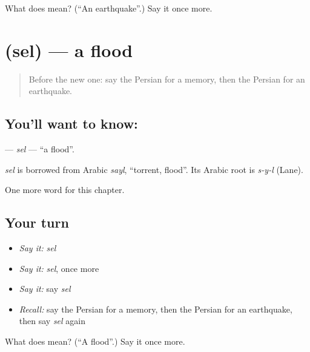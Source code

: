 \begin{tcolorbox}[breakable,colback=teal!4,colframe=teal!35!black,title={Before you move on}]
What does  mean? (\textquotedblleft{}An earthquake\textquotedblright{}.) Say it once more.
\end{tcolorbox}
\section[\texorpdfstring{\fa{سیل} (sel)}{سیل (sel)}]{ (sel) — a flood}

\label{lesson:FA-C244-sel}



\begin{quote}
Before the new one: say the Persian for a memory, then the Persian for an earthquake.
\end{quote}

\subsection*{You'll want to know: }
\textbf{} — \emph{sel} — \textquotedblleft{}a flood\textquotedblright{}.

\begin{cousinweb}
\emph{sel} is borrowed from Arabic \emph{sayl}, \textquotedblleft{}torrent, flood\textquotedblright{}. Its Arabic root is \emph{s-y-l} (Lane).
\end{cousinweb}

\begin{grammarlens}[title={What you've built}]
One more word for this chapter.
\end{grammarlens}

\subsection*{Your turn}
\begin{itemize}
\raggedright
  \item \emph{Say it:} \emph{sel}
  \item \emph{Say it:} \emph{sel}, once more
  \item \emph{Say it:} say \emph{sel}
  \item \emph{Recall:} say the Persian for a memory, then the Persian for an earthquake, then say \emph{sel} again
\end{itemize}

\begin{tcolorbox}[breakable,colback=teal!4,colframe=teal!35!black,title={Before you move on}]
What does  mean? (\textquotedblleft{}A flood\textquotedblright{}.) Say it once more.
\end{tcolorbox}
